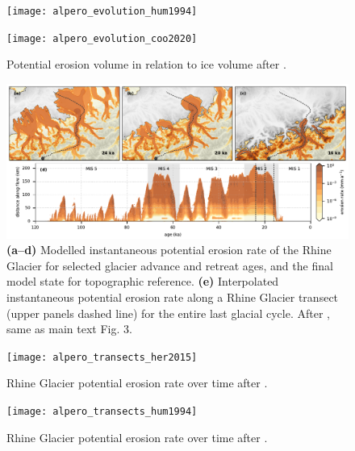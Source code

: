 \documentclass[esurf]{copernicus}
\begin{document}
    \begin{figure}
      \begin{minipage}[t]{85mm}
      \texttt{[image: alpero\_evolution\_hum1994]}
      \caption{%
        Potential erosion volume in relation to ice volume after
        \citet{Humphrey.Raymond.1994}.}
      \end{minipage}
      \hfill
      \begin{minipage}[t]{85mm}
      \texttt{[image: alpero\_evolution\_coo2020]}
      \caption{%
        Potential erosion volume in relation to ice volume after
        \citet{Cook.etal.2020}.}
      \end{minipage}
    \end{figure}

    \begin{figure}
      \centerline{\includegraphics{alpero_transects}}
      \caption[%
        Rhine Glacier potential erosion rate over time after
        \citet{Koppes.etal.2015}, same as main text Fig. 3.
      ]{%
        \textbf{(a--d)} Modelled instantaneous potential erosion rate of the
          Rhine Glacier for selected glacier advance and retreat ages, and the
          final model state for topographic reference.
        \textbf{(e)} Interpolated instantaneous potential erosion rate along a
          Rhine Glacier transect (upper panels dashed line) for the entire last
          glacial cycle.
        After \citet{Koppes.etal.2015}, same as main text Fig. 3.}
    \end{figure}

    \begin{figure}
      \texttt{[image: alpero\_transects\_her2015]}
      \caption{%
        Rhine Glacier potential erosion rate over time after
        \citet{Herman.etal.2015}.}
    \end{figure}

    \begin{figure}
      \texttt{[image: alpero\_transects\_hum1994]}
      \caption{%
        Rhine Glacier potential erosion rate over time after
        \citet{Humphrey.Raymond.1994}.}
    \end{figure}
\end{document}
